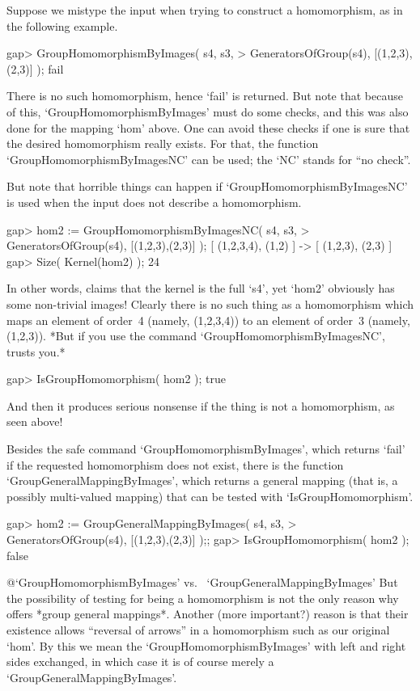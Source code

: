 Suppose we mistype the input when trying to construct a homomorphism,
as in the following example.

\beginexample
gap> GroupHomomorphismByImages( s4, s3,
>        GeneratorsOfGroup(s4), [(1,2,3),(2,3)] );
fail
\endexample

There is no such homomorphism, hence `fail' is returned.
But note that because of this, `GroupHomomorphismByImages' must do
some checks, and this was also done for the mapping `hom' above.
One can avoid these checks if one is sure that the desired
homomorphism really exists.
For that, the function `GroupHomomorphismByImagesNC' can be used;
the `NC' stands for ``no check''.

But note that horrible things can happen if `GroupHomomorphismByImagesNC'
is used when the input does not describe a homomorphism.

\beginexample
gap> hom2 := GroupHomomorphismByImagesNC( s4, s3,
>            GeneratorsOfGroup(s4), [(1,2,3),(2,3)] );
[ (1,2,3,4), (1,2) ] -> [ (1,2,3), (2,3) ]
gap> Size( Kernel(hom2) );
24
\endexample

In other words, {\GAP} claims that the kernel is the full `s4',
yet `hom2' obviously has some non-trivial images!
Clearly there is no such thing as a homomorphism
which maps an element of order~4 (namely, (1,2,3,4))
to an element of order~3 (namely, (1,2,3)).
*But if you use the command `GroupHomomorphismByImagesNC',
{\GAP} trusts you.*

\beginexample
gap> IsGroupHomomorphism( hom2 );
true
\endexample

And then it produces serious nonsense if the thing is not a homomorphism,
as seen above!

Besides the safe command `GroupHomomorphismByImages',
which returns `fail' if the requested homomorphism does not exist,
there is the function `GroupGeneralMappingByImages',
which returns a general mapping (that is, a possibly multi-valued
mapping) that can be tested with `IsGroupHomomorphism'.

\beginexample
gap> hom2 := GroupGeneralMappingByImages( s4, s3,
>            GeneratorsOfGroup(s4), [(1,2,3),(2,3)] );;
gap> IsGroupHomomorphism( hom2 );
false
\endexample

%
{@\noexpand `GroupHomomorphismByImages' vs.\ %
\noexpand `GroupGeneralMappingByImages'}
But the  possibility of testing for being  a homomorphism is not the only
reason  why    {\GAP} offers  *group   general  mappings*.  Another (more
important?) reason is that  their existence allows ``reversal of arrows''
in a  homomorphism such   as  our original  `hom'. By   this we mean  the
`GroupHomomorphismByImages' with left and right sides exchanged, in which
case it is of course merely a `GroupGeneralMappingByImages'.

